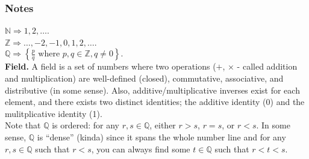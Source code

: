 \documentclass[../analysis_notes.tex]{subfiles}
\begin{document}
\subsubsection{Notes}

$\mathbb{N} \Longrightarrow {1, 2, \dots}$. \\
$\mathbb{Z} \Longrightarrow {\dots, -2, -1, 0, 1, 2, \dots}$. \\
$\mathbb{Q} \Longrightarrow \left\{\frac{p}{q} \text{ where } p, q \in \mathbb{Z}, q \not = 0\right\}.$ \\


\textbf{Field.}    
A field is a set of numbers where two operations ($+$, $\times$ - called addition and multiplication) are well-defined (closed), commutative, associative, and distributive (in some sense). Also, additive/multiplicative inverses exist for each element, and there exists two distinct identities; the additive identity (0) and the mulitplicative identity (1). \\

Note that $\mathbb{Q}$ is ordered: for any $r, s \in \mathbb{Q}$, either $r > s$, $r = s$, or $r < s$.        
In some sense, $\mathbb{Q}$ is ``dense'' (kinda) since it spans the whole number line and for any $r, s \in \mathbb{Q}$ such that $r < s$, you can always find some $t \in \mathbb{Q}$ such that $r < t < s$.
\end{document}
